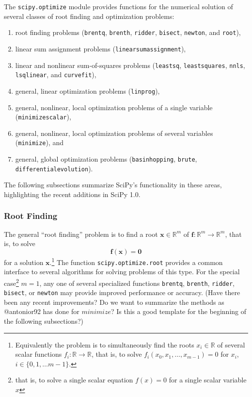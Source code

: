 \newcommand{\RR}{\ensuremath{\mathbb{R}}}
The \texttt{scipy.optimize} module provides functions for the numerical solution of several classes of root finding and optimization problems:
\begin{enumerate}
\item root finding problems (\texttt{brentq}, \texttt{brenth}, \texttt{ridder}, \texttt{bisect}, \texttt{newton}, and \texttt{root}),
\item linear sum assignment problems (\texttt{linear\textunderscore sum\textunderscore assignment}),
\item linear and nonlinear sum-of-squares problems (\texttt{leastsq}, \texttt{least\textunderscore squares}, \texttt{nnls}, \texttt{lsq\textunderscore linear}, and \texttt{curve\textunderscore fit}),
\item general, linear optimization problems (\texttt{linprog}),
\item general, nonlinear, local optimization problems of a single variable (\texttt{minimize\textunderscore scalar}),
\item general, nonlinear, local optimization problems of several variables (\texttt{minimize}), and
\item general, global optimization problems (\texttt{basinhopping}, \texttt{brute}, \texttt{differential\textunderscore evolution}).
\end{enumerate}
The following subsections summarize SciPy's functionality in these areas, highlighting the recent additions in SciPy 1.0.

\subsubsection{Root Finding}
The general ``root finding'' problem is to find a root $\mathbf{x} \in \RR^m$ of $\mathbf{f}: \RR^m \rightarrow \RR^m$, that is, to solve
\begin{equation}
\mathbf{f}(\mathbf{x}) = \mathbf{0}
\end{equation}
for a solution $\mathbf{x}$.\footnote{Equivalently the problem is to simultaneously find the roots $x_i \in \RR$ of several scalar functions $f_i : \RR \rightarrow \RR$, that is, to solve $f_i(x_0, x_1, \dots, x_{m-1}) = 0$ for $x_i$, $i \in \{0, 1, \dots {m-1}\}$.} The function \texttt{scipy.optimize.root} provides a common interface to several algorithms for solving problems of this type. For the special case\footnote{that is, to solve a single scalar equation $f(x) = 0$ for a single scalar variable $x$} $m = 1$, any one of several specialized functions \texttt{brentq}, \texttt{brenth}, \texttt{ridder}, \texttt{bisect}, or \texttt{newton} may provide improved performance or accuracy. (Have there been any recent improvements? Do we want to summarize the methods as @antonior92 has done for $minimize$? Is this a good template for the beginning of the following subsections?)

